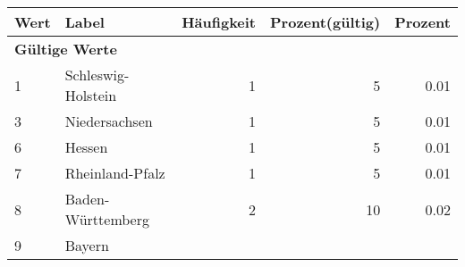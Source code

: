      \begin{longtable}{lXrrr}
     \toprule
     \textbf{Wert} & \textbf{Label} & \textbf{Häufigkeit} & \textbf{Prozent(gültig)} & \textbf{Prozent} \\
     \endhead
     \midrule
     \multicolumn{5}{l}{\textbf{Gültige Werte}}\\

     1 &
     \multicolumn{1}{X}{ Schleswig-Holstein   } &


       \num{1} &
       \num[round-mode=places,round-precision=2]{5} &
         \num[round-mode=places,round-precision=2]{0.01} \\

     3 &
     \multicolumn{1}{X}{ Niedersachsen   } &


       \num{1} &
       \num[round-mode=places,round-precision=2]{5} &
         \num[round-mode=places,round-precision=2]{0.01} \\

     6 &
     \multicolumn{1}{X}{ Hessen   } &


       \num{1} &
       \num[round-mode=places,round-precision=2]{5} &
         \num[round-mode=places,round-precision=2]{0.01} \\

     7 &
     \multicolumn{1}{X}{ Rheinland-Pfalz   } &


       \num{1} &
       \num[round-mode=places,round-precision=2]{5} &
         \num[round-mode=places,round-precision=2]{0.01} \\

     8 &
     \multicolumn{1}{X}{ Baden-Württemberg   } &


       \num{2} &
       \num[round-mode=places,round-precision=2]{10} &
         \num[round-mode=places,round-precision=2]{0.02} \\

     9 &
     \multicolumn{1}{X}{ Bayern   } &



\end{longtable}
